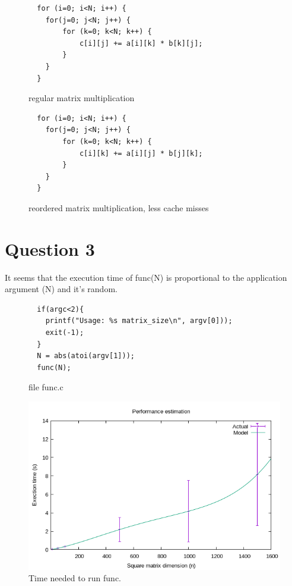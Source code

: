 \documentclass[12pt]{article}
\begin{document}
\newpage

\begin{figure}[h!]
	\begin{verbatim}
  for (i=0; i<N; i++) {
	for(j=0; j<N; j++) {    
		for (k=0; k<N; k++) {
			c[i][j] += a[i][k] * b[k][j];
		}
	}
  }
	\end{verbatim}
	\caption{regular matrix multiplication}\label{code:func}
\end{figure}

\begin{figure}[h!]
	\begin{verbatim}
  for (i=0; i<N; i++) {
	for(j=0; j<N; j++) {
		for (k=0; k<N; k++) {
			c[i][k] += a[i][j] * b[j][k];
		}
	}
  }
	\end{verbatim}
	\caption{reordered matrix multiplication, less cache misses}\label{code:func}
\end{figure}

\section*{Question 3}

It seems that the execution time of func(N) is proportional to the application argument (N) and it's random.

\begin{figure}[h!]
\begin{verbatim}
  if(argc<2){
	printf("Usage: %s matrix_size\n", argv[0]));
	exit(-1);
  }
  N = abs(atoi(argv[1]));
  func(N);
\end{verbatim}
	\caption{file func.c}\label{code:func}
\end{figure}

\newpage

\begin{figure}[h!]
	\centering
	\includegraphics[width=0.9\linewidth]{func.png}
	\caption{Time needed to run func.}
	\label{fig:exectime}
\end{figure}
\end{document}
